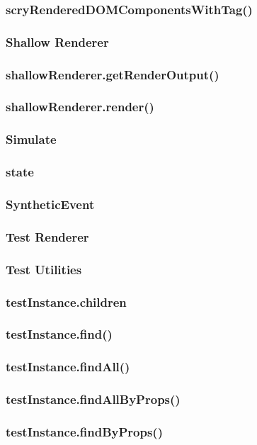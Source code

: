 \documentclass{book}
\begin{document}
\begin{CJK*}{UTF8}{gbsn}
\subsubsection{scryRenderedDOMComponentsWithTag()}
\subsubsection{Shallow Renderer}
\subsubsection{shallowRenderer.getRenderOutput()}
\subsubsection{shallowRenderer.render()}
\subsubsection{Simulate}
\subsubsection{state}
\subsubsection{SyntheticEvent}
\subsubsection{Test Renderer}
\subsubsection{Test Utilities}
\subsubsection{testInstance.children}
\subsubsection{testInstance.find()}
\subsubsection{testInstance.findAll()}
\subsubsection{testInstance.findAllByProps()}
\subsubsection{testInstance.findByProps()}

\end{CJK*}
\end{document}
